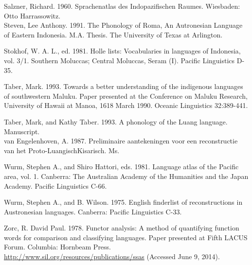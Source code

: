 \documentclass[10pt]{article}
\begin{document}
Salzner, Richard. 1960. Sprachenatlas des Indopazifischen Raumes. Wiesbaden: Otto Harrassowitz.\\
Steven, Lee Anthony. 1991. The Phonology of Roma, An Autronesian Language of Eastern Indonesia. M.A. Thesis. The University of Texas at Arlington.

Stokhof, W. A. L., ed. 1981. Holle lists: Vocabularies in languages of Indonesia, vol. 3/1. Southern Moluccas; Central Moluccas, Seram (I). Pacific Linguistics D-35.

Taber, Mark. 1993. Towards a better understanding of the indigenous languages of southwestern Maluku. Paper presented at the Conference on Maluku Research, University of Hawaii at Manoa, 1618 March 1990. Oceanic Linguistics 32:389-441.

Taber, Mark, and Kathy Taber. 1993. A phonology of the Luang language. Manuscript.\\
van Engelenhoven, A. 1987. Preliminaire aantekeningen voor een reconstructie van het Proto-LuangischKisarisch. Ms.

Wurm, Stephen A., and Shiro Hattori, eds. 1981. Language atlas of the Pacific area, vol. 1. Canberra: The Australian Academy of the Humanities and the Japan Academy. Pacific Linguistics C-66.

Wurm, Stephen A., and B. Wilson. 1975. English finderlist of reconstructions in Austronesian languages. Canberra: Pacific Linguistics C-33.

Zorc, R. David Paul. 1978. Functor analysis: A method of quantifying function words for comparison and classifying languages. Paper presented at Fifth LACUS Forum. Columbia: Hornbeam Press. \href{http://www.sil.org/resources/publications/ssas}{http://www.sil.org/resources/publications/ssas} (Accessed June 9, 2014).
\end{document}
